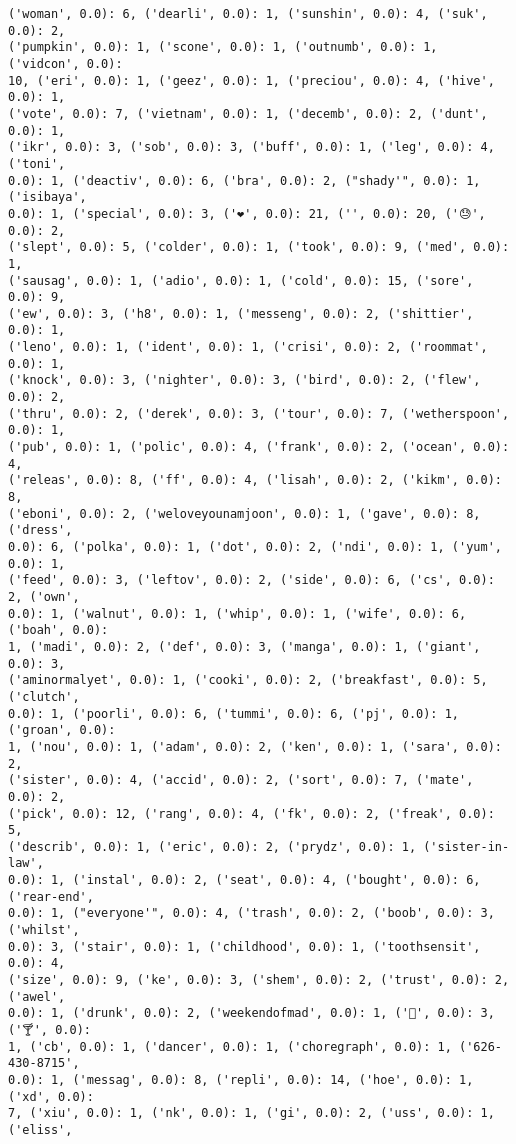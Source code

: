 \documentclass[11pt]{article}
\begin{document}
\begin{Verbatim}[commandchars=\\\{\}]
('woman', 0.0): 6, ('dearli', 0.0): 1, ('sunshin', 0.0): 4, ('suk', 0.0): 2,
('pumpkin', 0.0): 1, ('scone', 0.0): 1, ('outnumb', 0.0): 1, ('vidcon', 0.0):
10, ('eri', 0.0): 1, ('geez', 0.0): 1, ('preciou', 0.0): 4, ('hive', 0.0): 1,
('vote', 0.0): 7, ('vietnam', 0.0): 1, ('decemb', 0.0): 2, ('dunt', 0.0): 1,
('ikr', 0.0): 3, ('sob', 0.0): 3, ('buff', 0.0): 1, ('leg', 0.0): 4, ('toni',
0.0): 1, ('deactiv', 0.0): 6, ('bra', 0.0): 2, ("shady'", 0.0): 1, ('isibaya',
0.0): 1, ('special', 0.0): 3, ('❤', 0.0): 21, ('️', 0.0): 20, ('😓', 0.0): 2,
('slept', 0.0): 5, ('colder', 0.0): 1, ('took', 0.0): 9, ('med', 0.0): 1,
('sausag', 0.0): 1, ('adio', 0.0): 1, ('cold', 0.0): 15, ('sore', 0.0): 9,
('ew', 0.0): 3, ('h8', 0.0): 1, ('messeng', 0.0): 2, ('shittier', 0.0): 1,
('leno', 0.0): 1, ('ident', 0.0): 1, ('crisi', 0.0): 2, ('roommat', 0.0): 1,
('knock', 0.0): 3, ('nighter', 0.0): 3, ('bird', 0.0): 2, ('flew', 0.0): 2,
('thru', 0.0): 2, ('derek', 0.0): 3, ('tour', 0.0): 7, ('wetherspoon', 0.0): 1,
('pub', 0.0): 1, ('polic', 0.0): 4, ('frank', 0.0): 2, ('ocean', 0.0): 4,
('releas', 0.0): 8, ('ff', 0.0): 4, ('lisah', 0.0): 2, ('kikm', 0.0): 8,
('eboni', 0.0): 2, ('weloveyounamjoon', 0.0): 1, ('gave', 0.0): 8, ('dress',
0.0): 6, ('polka', 0.0): 1, ('dot', 0.0): 2, ('ndi', 0.0): 1, ('yum', 0.0): 1,
('feed', 0.0): 3, ('leftov', 0.0): 2, ('side', 0.0): 6, ('cs', 0.0): 2, ('own',
0.0): 1, ('walnut', 0.0): 1, ('whip', 0.0): 1, ('wife', 0.0): 6, ('boah', 0.0):
1, ('madi', 0.0): 2, ('def', 0.0): 3, ('manga', 0.0): 1, ('giant', 0.0): 3,
('aminormalyet', 0.0): 1, ('cooki', 0.0): 2, ('breakfast', 0.0): 5, ('clutch',
0.0): 1, ('poorli', 0.0): 6, ('tummi', 0.0): 6, ('pj', 0.0): 1, ('groan', 0.0):
1, ('nou', 0.0): 1, ('adam', 0.0): 2, ('ken', 0.0): 1, ('sara', 0.0): 2,
('sister', 0.0): 4, ('accid', 0.0): 2, ('sort', 0.0): 7, ('mate', 0.0): 2,
('pick', 0.0): 12, ('rang', 0.0): 4, ('fk', 0.0): 2, ('freak', 0.0): 5,
('describ', 0.0): 1, ('eric', 0.0): 2, ('prydz', 0.0): 1, ('sister-in-law',
0.0): 1, ('instal', 0.0): 2, ('seat', 0.0): 4, ('bought', 0.0): 6, ('rear-end',
0.0): 1, ("everyone'", 0.0): 4, ('trash', 0.0): 2, ('boob', 0.0): 3, ('whilst',
0.0): 3, ('stair', 0.0): 1, ('childhood', 0.0): 1, ('toothsensit', 0.0): 4,
('size', 0.0): 9, ('ke', 0.0): 3, ('shem', 0.0): 2, ('trust', 0.0): 2, ('awel',
0.0): 1, ('drunk', 0.0): 2, ('weekendofmad', 0.0): 1, ('🍹', 0.0): 3, ('🍸', 0.0):
1, ('cb', 0.0): 1, ('dancer', 0.0): 1, ('choregraph', 0.0): 1, ('626-430-8715',
0.0): 1, ('messag', 0.0): 8, ('repli', 0.0): 14, ('hoe', 0.0): 1, ('xd', 0.0):
7, ('xiu', 0.0): 1, ('nk', 0.0): 1, ('gi', 0.0): 2, ('uss', 0.0): 1, ('eliss',

\end{Verbatim}
\end{document}
